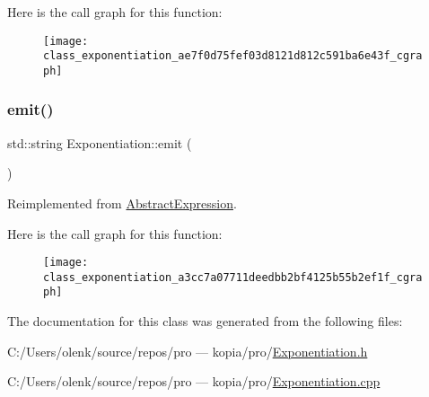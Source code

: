 Here is the call graph for this function\+:
\nopagebreak
\begin{figure}[H]
\begin{center}
\leavevmode
\texttt{[image: class\_exponentiation\_ae7f0d75fef03d8121d812c591ba6e43f\_cgraph]}
\end{center}
\end{figure}
\mbox{\label{class_exponentiation_a3cc7a07711deedbb2bf4125b55b2ef1f}} 
\subsubsection{\texorpdfstring{emit()}{emit()}}
{\footnotesize\ttfamily std\+::string Exponentiation\+::emit (\begin{DoxyParamCaption}{ }\end{DoxyParamCaption})\hspace{0.3cm}{\ttfamily [virtual]}}



Reimplemented from \mbox{\hyperlink{class_abstract_expression_a9f19c05e663491688cdf4423e002a391}{Abstract\+Expression}}.

Here is the call graph for this function\+:
\nopagebreak
\begin{figure}[H]
\begin{center}
\leavevmode
\texttt{[image: class\_exponentiation\_a3cc7a07711deedbb2bf4125b55b2ef1f\_cgraph]}
\end{center}
\end{figure}


The documentation for this class was generated from the following files\+:\begin{DoxyCompactItemize}
\item 
C\+:/\+Users/olenk/source/repos/pro — kopia/pro/\mbox{\hyperlink{_exponentiation_8h}{Exponentiation.\+h}}\item 
C\+:/\+Users/olenk/source/repos/pro — kopia/pro/\mbox{\hyperlink{_exponentiation_8cpp}{Exponentiation.\+cpp}}\end{DoxyCompactItemize}
